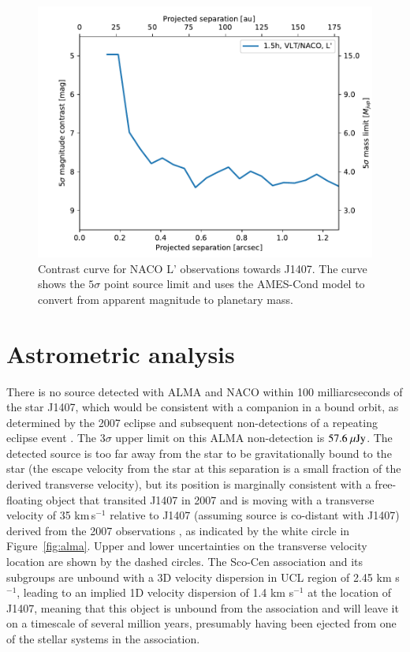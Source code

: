 \documentclass{aa} %
\newcommand{\kms}{km s$^{-1}$}
\begin{document}
\begin{figure}[tbh]
\begin{center}
  \includegraphics[width=\columnwidth]{J1407_L_prime_detection_limits_dusty_pca_5.pdf}
\caption{\label{fig:contrastc}Contrast curve for NACO L' observations towards J1407. The curve shows the $5\sigma$ point source limit and uses the AMES-Cond model to convert from apparent magnitude to planetary mass.}

\end{center}
\end{figure}%

\section{Astrometric analysis}\label{astrom} %

There is no source detected with ALMA and NACO within 100 milliarcseconds of the star J1407, which would be consistent with a companion in a bound orbit, as determined by the 2007 eclipse and subsequent non-detections of a repeating eclipse event \citep{Mentel18}.
%
The $3\sigma$ upper limit on this ALMA non-detection is $57.6{\rm~\mu Jy}$.
%
The detected source is too far away from the star to be gravitationally bound to the star (the escape velocity from the star at this separation is a small fraction of the derived transverse velocity), but its position is marginally consistent with a free-floating object that transited J1407 in 2007 and is moving with a transverse velocity of 35 km\,s$^{-1}$ relative to J1407 (assuming source is co-distant with J1407) derived from the 2007 observations \citep{Kenworthy15b}, as indicated by the white circle in Figure~\ref{fig:alma}.
%
Upper and lower uncertainties on the transverse velocity location are shown by the dashed circles.
%
The Sco-Cen association and its subgroups are unbound \citet{Wright18} with a 3D velocity dispersion in UCL region of 2.45 \kms{}, leading to an implied 1D velocity dispersion of 1.4 \kms{} at the location of J1407, meaning that this object is unbound from the association and will leave it on a timescale of several million years, presumably having been ejected from one of the stellar systems in the association.
\end{document}
